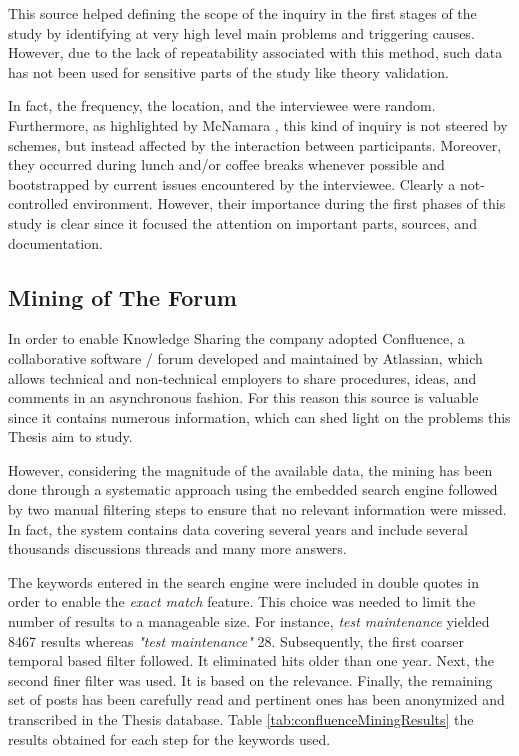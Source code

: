This source helped defining the scope of the inquiry in the first stages of the study by identifying at very high level main problems and triggering causes. However, due to the lack of repeatability associated with this method, such data has not been used for sensitive parts of the study like theory validation.

In fact, the frequency, the location, and the interviewee were random. Furthermore, as highlighted by McNamara \cite{general_guidelines_for_interview}, this kind of inquiry is not steered by schemes, but instead affected by the interaction between participants. Moreover, they occurred during lunch and/or coffee breaks whenever possible and bootstrapped by current issues encountered by the interviewee. Clearly a not-controlled environment. However, their importance during the first phases of this study is clear since it focused the attention on important parts, sources, and documentation.

\subsection{Mining of The Forum} \label{mining_forum}
In order to enable Knowledge Sharing the company adopted Confluence, a collaborative software / forum developed and maintained by Atlassian, which allows technical and non-technical employers to share procedures, ideas, and comments in an asynchronous fashion. For this reason this source is valuable since it contains numerous information, which can shed light on the problems this Thesis aim to study.

However, considering the magnitude of the available data, the mining has been done through a systematic approach using the embedded search engine followed by two manual filtering steps to ensure that no relevant information were missed. In fact, the system contains data covering several years and include several thousands discussions threads and many more answers. 

The keywords entered in the search engine were included in double quotes in order to enable the \textit{exact match} feature. This choice was needed to limit the number of results to a manageable size. For instance, \textit{test maintenance} yielded 8467 results whereas \textit{"test maintenance"} 28. Subsequently, the first coarser temporal based filter followed. It eliminated hits older than one year. Next, the second finer filter was used. It is based on the relevance. Finally, the remaining set of posts has been carefully read and pertinent ones has been anonymized and transcribed in the Thesis database. Table \ref{tab:confluenceMiningResults} the results obtained for each step for the keywords used.

